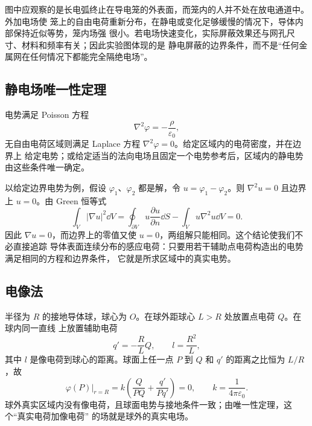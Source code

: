 图中应观察的是长电弧终止在导电笼的外表面，而笼内的人并不处在放电通道中。外加电场使
笼上的自由电荷重新分布，在静电或变化足够缓慢的情况下，导体内部保持近似等势，笼内场强
很小。若电场快速变化，实际屏蔽效果还与网孔尺寸、材料和频率有关；因此实验图体现的是
静电屏蔽的边界条件，而不是“任何金属网在任何情况下都能完全隔绝电场”。

\subsection*{静电场唯一性定理}

电势满足 Poisson 方程
\begin{equation}
  \boxed{\nabla^2\varphi=-\frac{\rho}{\varepsilon_0}},
\end{equation}
无自由电荷区域则满足 Laplace 方程 $\nabla^2\varphi=0$。给定区域内的电荷密度，并在边界上
给定电势；或给定适当的法向电场且固定一个电势参考后，区域内的静电势由这些条件唯一确定。

以给定边界电势为例，假设 $\varphi_1$、$\varphi_2$ 都是解，令
$u=\varphi_1-\varphi_2$。则 $\nabla^2u=0$ 且边界上 $u=0$。由 Green 恒等式
\begin{equation}
  \int_V|\nabla u|^2\dd V
  =\oint_{\partial V}u\frac{\partial u}{\partial n}\dd S
   -\int_Vu\nabla^2u\dd V=0.
\end{equation}
因此 $\nabla u=0$，而边界上的零值又使 $u=0$，两组解只能相同。这个结论使我们不必直接追踪
导体表面连续分布的感应电荷：只要用若干辅助点电荷构造出的电势满足相同的方程和边界条件，
它就是所求区域中的真实电势。

\discretePotentialDiagram

\subsection*{电像法}

半径为 $R$ 的接地导体球，球心为 $O$。在球外距球心 $L>R$ 处放置点电荷 $Q$。在球内同一直线
上放置辅助电荷
\begin{equation}
  \boxed{q'=-\frac{R}{L}Q,\qquad l=\frac{R^2}{L}},
\end{equation}
其中 $l$ 是像电荷到球心的距离。球面上任一点 $P$ 到 $Q$ 和 $q'$ 的距离之比恒为 $L/R$，故
\begin{equation}
  \left.\varphi(P)\right|_{r=R}
  =k\left(\frac{Q}{PQ}+\frac{q'}{Pq'}\right)=0,
  \qquad k=\frac1{4\pi\varepsilon_0}.
\end{equation}
球外真实区域内没有像电荷，且球面电势与接地条件一致；由唯一性定理，这个“真实电荷加像电荷”
的场就是球外的真实电场。

